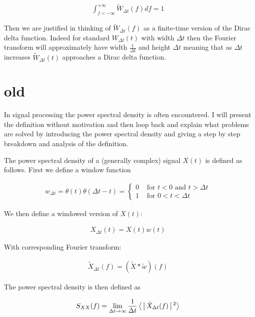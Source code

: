 \documentclass[12pt]{article}
\begin{document}
\begin{align}
\int_{f=-\infty}^{+\infty}\tilde{W}_{\Delta t}(f) df = 1
\end{align}

Then we are justified in thinking of $\tilde{W}_{\Delta t}(f)$ as a finite-time version of the Dirac delta function.
Indeed for standard $W_{\Delta t}(t)$ with width $\Delta t$ then the Fourier transform will approximately have width $\frac{1}{\Delta t}$ and height $\Delta t$ meaning that as $\Delta t$ increases $\tilde{W}_{\Delta t}(t)$ approaches a Dirac delta function.


\section{old}


In signal processing the power spectral density is often encountered. 
I will present the definition without motivation and then loop back and explain what problems are solved by introducing the power spectral density and giving a step by step breakdown and analysis of the definition.

The power spectral density of a (generally complex) signal $X(t)$ is defined as follows.
First we define a window function

\begin{align}
w_{\Delta t} = \theta(t)\theta(\Delta t-t) = 
\begin{cases}
0 & \text{ for } t<0 \text{ and } t>\Delta t\\
1 & \text{ for } 0 < t < \Delta t
\end{cases}
\end{align}

We then define a windowed version of $X(t)$:

\begin{align}
X_{\Delta t}(t) = X(t) w(t)
\end{align}

With corresponding Fourier transform:

\begin{align}
\tilde{X}_{\Delta t}(f) = (\tilde{X}\ast \tilde{w})(f)
\end{align}

The power spectral density is then defined as

\begin{align}
S_{XX}(f) = \lim_{\Delta t \rightarrow \infty} \frac{1}{\Delta t} \Braket{|\tilde{X}_{\Delta t}(f)|^2}
\end{align}
\end{document}
